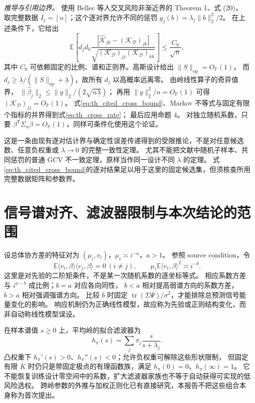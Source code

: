 \documentclass[UTF8,fontset=fandol,11pt,a4paper]{ctexart}
\begin{document}
\textit{推导与引用边界。}
使用 Bellec 等人交叉风险非渐近界\cite{bellec}的 Theorem 1、式 (20)，
取完整数据 $I_j=[n]$；这个逐对界允许不同的惩罚 $g_j(b)=\lambda_j\lVert b\rVert_2^2/2$。
在上述条件下，它给出
\begin{equation}\label{eq:th_cited_cross_bound}
 \mathbb E\left[
 d_jd_k\frac{|\widehat{\mathcal K}_{jk}-(\mathcal K_{\mathcal D})_{jk}|}
 {\sqrt{(\mathcal K_{\mathcal D})_{jj}(\mathcal K_{\mathcal D})_{kk}}}
 \right]\le\frac{C_0}{\sqrt n},
\end{equation}
其中 $C_0$ 可依赖固定的比例、谱和正则界。高斯设计给出 $\lVert S\rVert_{\mathrm{op}}=O_{\mathbb P}(1)$，
而 $d_j\ge\underline\lambda/(\lVert S\rVert_{\mathrm{op}}+\underline\lambda)$，故所有 $d_j$ 以高概率远离零。
由岭线性算子的奇异值界，
$\lVert\widehat\beta_j\rVert_2\le\lVert y\rVert_2/(2\sqrt{n\underline\lambda})$；
再用 $\lVert y\rVert_2^2/n=O_{\mathbb P}(1)$ 可得 $(\mathcal K_{\mathcal D})_{jj}=O_{\mathbb P}(1)$。
式\eqref{eq:th_cited_cross_bound}、Markov 不等式与固定有限个指标的并界得到式\eqref{eq:th_cross_rate}；
最后应用命题 4。
对独立随机系数，只要 $\beta^{\mathsf T}\Sigma_n\beta=O_{\mathbb P}(1)$，同样可条件化使用这个论证。

这是一条由现有逐对估计界与确定性误差传递得到的受限推论，不是对任意候选数、任意负权重或 $\lambda\to0$ 的完整一致性定理。
尤其不能把文献中随机子样本、共同惩罚的普通 GCV 不一致定理，原样当作同一设计不同 $\lambda$ 的定理。
式\eqref{eq:th_cited_cross_bound}的逐对结果足以用于这里的固定候选集，但须核查所用完整数据矩阵和参数界。

\section{信号谱对齐、滤波器限制与本次结论的范围}\label{sec:theory_source}
设总体协方差的特征对为 $(\mu_i,v_i)$，$\mu_i\asymp i^{-a}$，$a>1$。
参照 source condition，令
\begin{equation}\label{eq:th_source_condition}
 \mathbb E\langle v_i,\beta\rangle\langle v_j,\beta\rangle=0\ (i\ne j),\qquad
 \mu_i\mathbb E\langle v_i,\beta\rangle^2\asymp i^{-b}.
\end{equation}
这里是对先验的二阶矩条件，不是某一次随机系数的逐坐标等式\cite{lin,richards}。
相应系数方差与 $i^{a-b}$ 成比例；$b=a$ 对应各向同性，
$b<a$ 相对提高弱谱方向的系数方差，$b>a$ 相对强调强谱方向。
比较 $b$ 时固定 $\operatorname{tr}(\Sigma\Psi)/\sigma^2$，才能排除总预测信号能量变化的影响。
响应机制仍为正确线性模型，故应称为先验或正则结构变化，而非自动称线性模型误设。

在样本谱值 $s\ge0$ 上，平均岭的拟合滤波器为
\begin{equation}\label{eq:th_filter}
 h_\pi(s)=\sum_j\pi_j\frac{s}{s+\lambda_j}.
\end{equation}
凸权重下 $h_\pi'(s)>0$、$h_\pi''(s)<0$；允许负权重可解除这些形状限制，
但固定有限 $K$ 时仍只是带固定极点的有理函数族，满足 $h_\pi(0)=0$、$h_\pi(\infty)=1$。
它不能恢复训练设计零空间中的系数，扩大滤波器家族也不等于自动获得可实现的低风险选权。
跨岭参数的外推与加权正则化已有直接研究\cite{bach,wu}，本报告不把这些组合本身称为首次提出。
\end{document}

